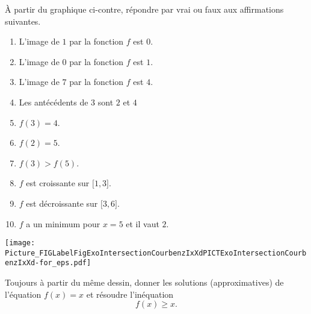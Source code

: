 
\begin{exercice}\label{exoSeconde-0069}

    \begin{multicols}{2}

À partir du graphique ci-contre, répondre par vrai ou faux aux affirmations suivantes.

\begin{enumerate}
    \item
       L'image de \( 1\) par la fonction \( f\) est \( 0\).
   \item
       L'image de \( 0\) par la fonction \( f\) est \( 1\).
   \item
       L'image de \( 7\) par la fonction \( f\) est \( 4\).
   \item
       Les antécédents de \( 3\) sont \( 2\) et \( 4\)
   \item
       \( f(3)=4\).
   \item
       \( f(2)=5\).
   \item
       \( f(3)>f(5)\).
   \item
       \( f\) est croissante sur \( \mathopen[ 1 , 3 \mathclose]\).
   \item
       \( f\) est décroissante sur \( \mathopen[ 3 , 6 \mathclose]\).
    \item
        \( f\) a un minimum pour \( x=5\) et il vaut \( 2\).

\end{enumerate}

\columnbreak


\texttt{[image: Picture\_FIGLabelFigExoIntersectionCourbenzIxXdPICTExoIntersectionCourbenzIxXd-for\_eps.pdf]}

    \end{multicols}

Toujours à partir du même dessin, donner les solutions (approximatives) de l'équation \( f(x)=x\) et résoudre l'inéquation
\begin{equation}
    f(x)\geq x.
\end{equation}


\end{exercice}
